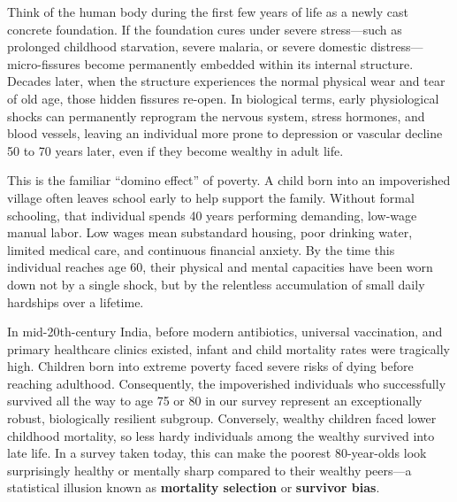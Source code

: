 \begin{description}[leftmargin=0.5cm, style=nextline]
    \item[\textbf{1. The Biological Scarring Idea (Sensitive Period):}]
    Think of the human body during the first few years of life as a newly cast concrete foundation. If the foundation cures under severe stress—such as prolonged childhood starvation, severe malaria, or severe domestic distress—micro-fissures become permanently embedded within its internal structure. Decades later, when the structure experiences the normal physical wear and tear of old age, those hidden fissures re-open. In biological terms, early physiological shocks can permanently reprogram the nervous system, stress hormones, and blood vessels, leaving an individual more prone to depression or vascular decline 50 to 70 years later, even if they become wealthy in adult life.

    \item[\textbf{2. The Chain of Hardship (Cumulative Disadvantage):}]
    This is the familiar ``domino effect'' of poverty. A child born into an impoverished village often leaves school early to help support the family. Without formal schooling, that individual spends 40 years performing demanding, low-wage manual labor. Low wages mean substandard housing, poor drinking water, limited medical care, and continuous financial anxiety. By the time this individual reaches age 60, their physical and mental capacities have been worn down not by a single shock, but by the relentless accumulation of small daily hardships over a lifetime.

    \item[\textbf{3. The Survivor Paradox (Selective Survival or Mortality Selection):}]
    In mid-20th-century India, before modern antibiotics, universal vaccination, and primary healthcare clinics existed, infant and child mortality rates were tragically high. Children born into extreme poverty faced severe risks of dying before reaching adulthood. Consequently, the impoverished individuals who successfully survived all the way to age 75 or 80 in our survey represent an exceptionally robust, biologically resilient subgroup. Conversely, wealthy children faced lower childhood mortality, so less hardy individuals among the wealthy survived into late life. In a survey taken today, this can make the poorest 80-year-olds look surprisingly healthy or mentally sharp compared to their wealthy peers—a statistical illusion known as \textbf{mortality selection} or \textbf{survivor bias}.


\end{description}
